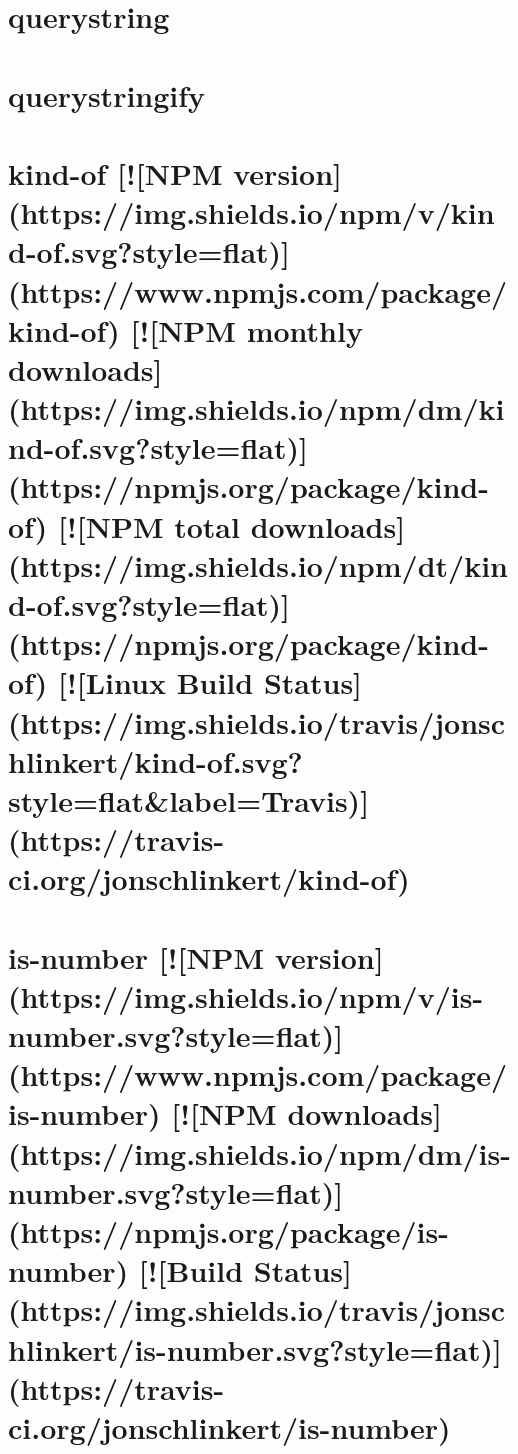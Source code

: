 \documentclass[twoside]{book}
\newcommand{\+}{\discretionary{\mbox{\scriptsize$\hookleftarrow$}}{}{}}
\begin{document}
\chapter{querystring}
\label{md__c_1_workspace_demo_src_main_script_node_modules_querystring-es3__readme}

\chapter{querystringify}
\label{md__c_1_workspace_demo_src_main_script_node_modules_querystringify__r_e_a_d_m_e}

\chapter{kind-\/of \mbox{[}!\mbox{[}N\+PM version\mbox{]}(https\+://img.shields.\+io/npm/v/kind-\/of.svg?style=flat)\mbox{]}(https\+://www.npmjs.\+com/package/kind-\/of) \mbox{[}!\mbox{[}N\+PM monthly downloads\mbox{]}(https\+://img.shields.\+io/npm/dm/kind-\/of.svg?style=flat)\mbox{]}(https\+://npmjs.org/package/kind-\/of) \mbox{[}!\mbox{[}N\+PM total downloads\mbox{]}(https\+://img.shields.\+io/npm/dt/kind-\/of.svg?style=flat)\mbox{]}(https\+://npmjs.org/package/kind-\/of) \mbox{[}!\mbox{[}Linux Build Status\mbox{]}(https\+://img.shields.\+io/travis/jonschlinkert/kind-\/of.svg?style=flat\&label=Travis)\mbox{]}(https\+://travis-\/ci.org/jonschlinkert/kind-\/of)}
\label{md__c_1_workspace_demo_src_main_script_node_modules_randomatic_node_modules_is-number_node_modules_kind-of__r_e_a_d_m_e}

\chapter{is-\/number \mbox{[}!\mbox{[}N\+PM version\mbox{]}(https\+://img.shields.\+io/npm/v/is-\/number.svg?style=flat)\mbox{]}(https\+://www.npmjs.\+com/package/is-\/number) \mbox{[}!\mbox{[}N\+PM downloads\mbox{]}(https\+://img.shields.\+io/npm/dm/is-\/number.svg?style=flat)\mbox{]}(https\+://npmjs.org/package/is-\/number) \mbox{[}!\mbox{[}Build Status\mbox{]}(https\+://img.shields.\+io/travis/jonschlinkert/is-\/number.svg?style=flat)\mbox{]}(https\+://travis-\/ci.org/jonschlinkert/is-\/number)}
\label{md__c_1_workspace_demo_src_main_script_node_modules_randomatic_node_modules_is-number__r_e_a_d_m_e}

\end{document}
